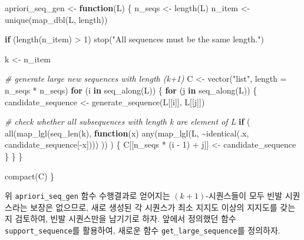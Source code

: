 \documentclass[
]{book}
\newenvironment{Shaded}{\begin{snugshade}}{\end{snugshade}}
\newcommand{\AttributeTok}[1]{\textcolor[rgb]{0.77,0.63,0.00}{#1}}
\newcommand{\CommentTok}[1]{\textcolor[rgb]{0.56,0.35,0.01}{\textit{#1}}}
\newcommand{\ControlFlowTok}[1]{\textcolor[rgb]{0.13,0.29,0.53}{\textbf{#1}}}
\newcommand{\DecValTok}[1]{\textcolor[rgb]{0.00,0.00,0.81}{#1}}
\newcommand{\FunctionTok}[1]{\textcolor[rgb]{0.00,0.00,0.00}{#1}}
\newcommand{\NormalTok}[1]{#1}
\newcommand{\OtherTok}[1]{\textcolor[rgb]{0.56,0.35,0.01}{#1}}
\newcommand{\SpecialCharTok}[1]{\textcolor[rgb]{0.00,0.00,0.00}{#1}}
\newcommand{\StringTok}[1]{\textcolor[rgb]{0.31,0.60,0.02}{#1}}
\begin{document}
\begin{Shaded}
\begin{Highlighting}[]
\NormalTok{apriori\_seq\_gen }\OtherTok{\textless{}{-}} \ControlFlowTok{function}\NormalTok{(L) \{}
\NormalTok{  n\_seqs }\OtherTok{\textless{}{-}} \FunctionTok{length}\NormalTok{(L)}
\NormalTok{  n\_item }\OtherTok{\textless{}{-}} \FunctionTok{unique}\NormalTok{(}\FunctionTok{map\_dbl}\NormalTok{(L, length))}
  
  \ControlFlowTok{if}\NormalTok{ (}\FunctionTok{length}\NormalTok{(n\_item) }\SpecialCharTok{\textgreater{}} \DecValTok{1}\NormalTok{) }\FunctionTok{stop}\NormalTok{(}\StringTok{"All sequences must be the same length."}\NormalTok{)}
  
\NormalTok{  k }\OtherTok{\textless{}{-}}\NormalTok{ n\_item}
  
  \CommentTok{\# generate large new sequences with length (k+1)}
\NormalTok{  C }\OtherTok{\textless{}{-}} \FunctionTok{vector}\NormalTok{(}\StringTok{"list"}\NormalTok{, }\AttributeTok{length =}\NormalTok{ n\_seqs }\SpecialCharTok{*}\NormalTok{ n\_seqs)}
  \ControlFlowTok{for}\NormalTok{ (i }\ControlFlowTok{in} \FunctionTok{seq\_along}\NormalTok{(L)) \{}
    \ControlFlowTok{for}\NormalTok{ (j }\ControlFlowTok{in} \FunctionTok{seq\_along}\NormalTok{(L)) \{}
\NormalTok{      candidate\_sequence }\OtherTok{\textless{}{-}} \FunctionTok{generate\_sequence}\NormalTok{(L[[i]], L[[j]])}
      
      \CommentTok{\# check whether all subsequences with length k are element of L}
      \ControlFlowTok{if}\NormalTok{ (}
        \FunctionTok{all}\NormalTok{(}\FunctionTok{map\_lgl}\NormalTok{(}\FunctionTok{seq\_len}\NormalTok{(k), }\ControlFlowTok{function}\NormalTok{(x) }
          \FunctionTok{any}\NormalTok{(}\FunctionTok{map\_lgl}\NormalTok{(L, }\SpecialCharTok{\textasciitilde{}}\FunctionTok{identical}\NormalTok{(.x, candidate\_sequence[}\SpecialCharTok{{-}}\NormalTok{x])))}
\NormalTok{        ))}
\NormalTok{      ) \{}
\NormalTok{        C[[n\_seqs }\SpecialCharTok{*}\NormalTok{ (i }\SpecialCharTok{{-}} \DecValTok{1}\NormalTok{) }\SpecialCharTok{+}\NormalTok{ j]] }\OtherTok{\textless{}{-}}\NormalTok{ candidate\_sequence}
\NormalTok{      \}}
\NormalTok{    \}}
\NormalTok{  \}}
  
  \FunctionTok{compact}\NormalTok{(C)}
\NormalTok{\}}
\end{Highlighting}
\end{Shaded}

위 \texttt{apriori\_seq\_gen} 함수 수행결과로 얻어지는 \((k+1)\)-시퀀스들이 모두 빈발 시퀀스라는 보장은 없으므로, 새로 생성된 각 시퀀스가 최소 지지도 이상의 지지도를 갖는지 검토하여, 빈발 시퀀스만을 남기기로 하자. 앞에서 정의했던 함수 \texttt{support\_sequence}를 활용하여, 새로운 함수 \texttt{get\_large\_sequence}를 정의하자.
\end{document}
